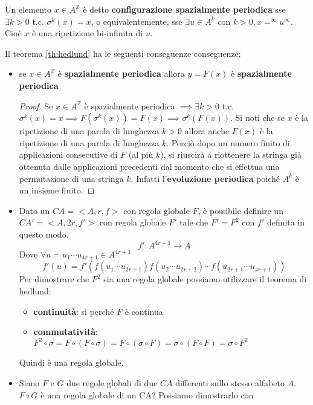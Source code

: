 \begin{definizione}
    Un elemento $x\in A^\mathbb{Z}$ è detto \textbf{configurazione spazialmente 
    periodica} sse $\exists k>0 $ t.c. $\sigma^k(x) = x$, o equivalentemente, sse 
    $\exists u\in A^k$ con $k>0, x = ^\infty u ^\infty$. Cioè $x$ è una ripetizione
    bi-infinita di $u$.
\end{definizione}

Il teorema \ref{th:hedlund} ha le seguenti conseguenze conseguenze:
\begin{itemize}
    \item se $x\in A^\mathbb{Z}$ è \textbf{spazialmente periodica} allora $y=F(x)$
    è  \textbf{spazialmente periodica}
    \begin{proof}
        Se $x\in A^\mathbb{Z}$  è spazialmente periodica $\implies\exists k>0$ t.c.
        $\sigma^k(x)=x \implies F(\sigma^k(x)) = F(x)\implies \sigma^k(F(x))$.
        Si noti che se $x$ è la ripetizione di una parola di lunghezza $k>0$ allora
        anche $F(x)$ è la ripetizione di una parola di lunghezza $k$. Perciò dopo
        un numero finito di applicazioni consecutive di $F$ (al più $k$), si riuscirà
        a riottenere la stringa già ottenuta dalle applicazioni precedenti dal momento
        che si effettua una permutazione di una stringa $k$. Infatti l'\textbf{evoluzione 
        periodica} poiché $A^k$ è un insieme finito.
    \end{proof}
    \item Dato un $CA = <A,r,f>$ con regola globale $F$, è possibile definire un  $CA '= <A,2r,f'>$ 
    con regola globale $F'$ tale che $F'=F^2$ con $f'$ definita in questo modo.
    $$f':A^{4r+1}\rightarrow A$$
    Dove $\forall u=u_1\cdots u_{4r+1}\in A^{4r+1}$
    $$f'(u) = f'(f(u_1\cdots u_{2r+1})f(u_{2}\cdots u_{2r+2})\cdots f(u_{2r+1}\cdots u_{4r+1}))$$
    Per dimostrare che $F^2$ sia una regola globale possiamo utilizzare il teorema di 
    hedlund:
    \begin{itemize}
        \item \textbf{continuità}: si perché $F$ è continua
        \item \textbf{commutatività}: $F^2\circ \sigma = F\circ (F\circ \sigma ) = F\circ (\sigma\circ F  ) = \sigma\circ (F\circ F  )  = \sigma \circ F^2$
    \end{itemize}
    Quindi è una regola globale.
    \item Siano $F$ e $G$ due regole globali di due $CA$ differenti sullo stesso 
    alfabeto $A$. $F\circ G$ è una regola globale di un CA? Possiamo dimostrarlo con

\end{itemize}
